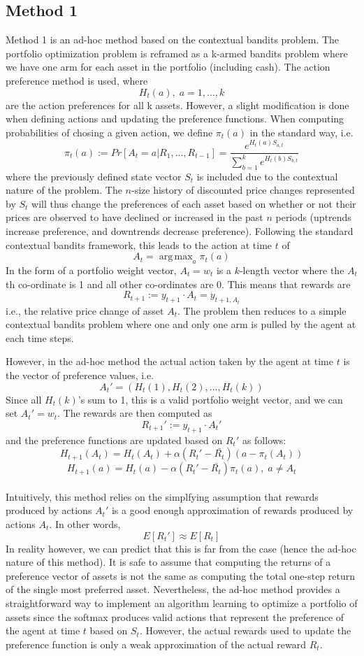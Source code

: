 \documentclass[a4paper,12pt]{article}
\DeclareMathOperator*{\argmax}{arg\,max}
\begin{document}
\subsection{Method 1}
Method 1 is an ad-hoc method based on the contextual bandits problem. The portfolio optimization problem is reframed as a k-armed bandits problem where we have one arm for each asset in the portfolio (including cash). The action preference method is used, where 
$$H_t(a), \; a = 1,...,k$$
are the action preferences for all k assets. However, a slight modification is done when defining actions and updating the preference functions. When computing probabilities of chosing a given action, we define $\pi_t (a)$ in the standard way, i.e.
$$\pi_t (a) := Pr[A_t=a | R_1,...,R_{t-1}] = \frac{e^{H_t(a) S_{a,t}}}{\sum_{b=1}^{k} e^{H_t(b) S_{b,t}}}$$
where the previously defined state vector $S_t$ is included due to the contextual nature of the problem. The $n$-size history of discounted price changes represented by $S_t$ will thus change the preferences of each asset based on whether or not their prices are observed to have declined or increased in the past $n$ periods (uptrends increase preference, and downtrends decrease preference). Following the standard contextual bandits framework, this leads to the action at time $t$ of
$$A_t = \argmax_a \pi_t(a)$$
In the form of a portfolio weight vector, $A_t = w_t$ is a $k$-length vector where the $A_t$th co-ordinate is 1 and all other co-ordinates are 0. This means that rewards are
$$R_{t+1} := y_{t+1} \cdot A_t = y_{t+1,A_t}$$
i.e., the relative price change of asset $A_t$. The problem then reduces to a simple contextual bandits problem where one and only one arm is pulled by the agent at each time steps. \par
However, in the ad-hoc method the actual action taken by the agent at time $t$ is the vector of preference values, i.e. 
$$A_t' = (H_t(1),H_t(2),...,H_t(k))$$ 
Since all $H_t(k)$'s sum to 1, this is a valid portfolio weight vector, and we can set $A_t' = w_t$. The rewards are then computed as 
$$R_{t+1}' :=  y_{t+1} \cdot A_t'$$
and the preference functions are updated based on $R_t'$ as follows:
$$H_{t+1}(A_t) = H_t(A_t) + \alpha (R_t' - \bar{R_t})(a - \pi_t(A_t))$$ 
$$H_{t+1}(a) = H_t(a) - \alpha (R_t' - \bar{R_t})\pi_t(a), \; a \neq A_t$$ \\
Intuitively, this method relies on the simplfying assumption that rewards produced by actions $A_t'$ is a good enough approximation of rewards produced by actions $A_t$. In other words, 
$$E[R_t'] \approx E[R_t]$$
In reality however, we can predict that this is far from the case (hence the ad-hoc nature of this method). It is safe to assume that computing the returns of a preference vector of assets is not the same as computing the total one-step return of the single most preferred asset. Nevertheless, the ad-hoc method provides a straightforward way to implement an algorithm learning to optimize a portfolio of assets since the softmax produces valid actions that represent the preference of the agent at time $t$ based on $S_t$. However, the actual rewards used to update the preference function is only a weak approximation of the actual reward $R_t$.
\end{document}
